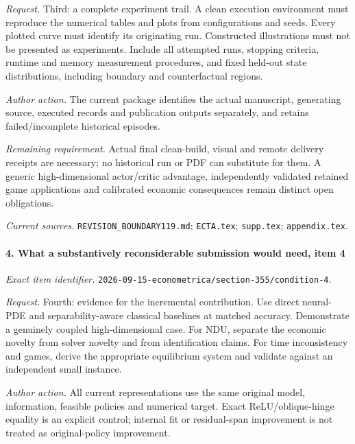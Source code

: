 \par\emph{Request.} Third: a complete experiment trail. A clean execution environment must reproduce the numerical tables and plots from configurations and seeds. Every plotted curve must identify its originating run. Constructed illustrations must not be presented as experiments. Include all attempted runs, stopping criteria, runtime and memory measurement procedures, and fixed held-out state distributions, including boundary and counterfactual regions.

\par\emph{Author action.} The current package identifies the actual manuscript, generating source, executed records and publication outputs separately, and retains failed/\allowbreak{}incomplete historical episodes.

\par\emph{Remaining requirement.} Actual final clean-build, visual and remote delivery receipts are necessary; no historical run or PDF can substitute for them. A generic high-dimensional actor/\allowbreak{}critic advantage, independently validated retained game applications and calibrated economic consequences remain distinct open obligations.

\par\emph{Current sources.} \nolinkurl{REVISION_BOUNDARY119.md}; \nolinkurl{ECTA.tex}; \nolinkurl{supp.tex}; \nolinkurl{appendix.tex}.

\paragraph{4. What a substantively reconsiderable submission would need, item 4}

\emph{Exact item identifier.} \nolinkurl{2026-09-15-econometrica/section-355/condition-4}.

\par\emph{Request.} Fourth: evidence for the incremental contribution. Use direct neural-PDE and separability-aware classical baselines at matched accuracy. Demonstrate a genuinely coupled high-dimensional case. For NDU, separate the economic novelty from solver novelty and from identification claims. For time inconsistency and games, derive the appropriate equilibrium system and validate against an independent small instance.

\par\emph{Author action.} All current representations use the same original model, information, feasible policies and numerical target. Exact ReLU/\allowbreak{}oblique-hinge equality is an explicit control; internal fit or residual-span improvement is not treated as original-policy improvement.


